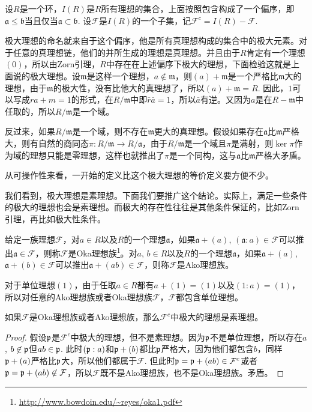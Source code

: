 \para 设$R$是一个环，$I(R)$是$R$所有理想的集合，上面按照包含构成了一个偏序，即$\mathfrak{a}\leq \mathfrak{b}$当且仅当$\mathfrak{a}\subset \mathfrak{b}$. 设$\mathcal{F}$是$I(R)$的一个子集，记$\mathcal{F}^c=I(R)-\mathcal{F}$.

极大理想的命名就来自于这个偏序，他是所有真理想构成的集合中的极大元素。对于任意的真理想链，他们的并所生成的理想是真理想。并且由于$R$肯定有一个理想$(0)$，所以由Zorn引理，$R$中存在在上述偏序下极大的理想，下面检验这就是上面说的极大理想。设$\mathfrak{m}$是这样一个理想，$a\notin \mathfrak{m}$，则$(a)+\mathfrak{m}$是一个严格比$\mathfrak{m}$大的理想，由于$\mathfrak{m}$的极大性，没有比他大的真理想了，所以$(a)+\mathfrak{m}=R$. 因此，$1$可以写成$ra+m=1$的形式，在$R/\mathfrak{m}$中即$\bar{r}\bar{a}=1$，所以$\bar{a}$有逆。又因为$a$是在$R-\mathfrak{m}$中任取的，所以$R/\mathfrak{m}$是一个域。

反过来，如果$R/\mathfrak{m}$是一个域，则不存在$\mathfrak{m}$更大的真理想。假设如果存在$\mathfrak{a}$比$\mathfrak{m}$严格大，则有自然的商同态$\pi:R/\mathfrak{m}\to R/\mathfrak{a}$，由于$R/\mathfrak{m}$是一个域且$\pi$是满射，则$\ker \pi$作为域的理想只能是零理想，这样也就推出了$\pi$是一个同构，这与$\mathfrak{a}$比$\mathfrak{m}$严格大矛盾。

从可操作性来看，一开始的定义比这个极大理想的等价定义要方便不少。

\para \label{oka}我们看到，极大理想是素理想。下面我们要推广这个结论。实际上，满足一些条件的极大的理想也会是素理想。而极大的存在性往往是其他条件保证的，比如Zorn引理，再比如极大性条件。

给定一族理想$\mathcal{F}$，对$a\in R$以及$R$的一个理想$\mathfrak{a}$，如果$\mathfrak{a}+(a)$, $(\mathfrak{a}:a)\in \mathcal{F}$可以推出$\mathfrak{a}\in \mathcal{F}$，则称$\mathcal{F}$是Oka理想族\footnote{\url{http://www.bowdoin.edu/~reyes/oka1.pdf}}。对$a$, $b\in R$以及$R$的一个理想$\mathfrak{a}$，如果$\mathfrak{a}+(a)$, $\mathfrak{a}+(b)\in \mathcal{F}$可以推出$\mathfrak{a}+(ab)\in \mathcal{F}$，则称$\mathcal{F}$是Ako理想族。

对于单位理想$(1)$，由于任取$a\in R$都有$a+(1)=(1)$以及$(1:a)=(1)$，所以对任意的Ako理想族或者Oka理想族$\mathcal{F}$，$\mathcal{F}$都包含单位理想。

\begin{pro} 如果$\mathcal{F}$是Oka理想族或者Ako理想族，那么$\mathcal{F}^c$中极大的理想是素理想。
\end{pro}

\begin{proof}
	假设$\mathfrak{p}$是$\mathcal{F}^c$中极大的理想，但不是素理想。因为$\mathfrak{p}$不是单位理想，所以存在$a$, $b\not\in \mathfrak{p}$但$ab\in\mathfrak{p}$. 此时$(\mathfrak{p}:a)$和$\mathfrak{p}+(b)$都比$\mathfrak{p}$严格大，因为他们都包含$b$，同样$\mathfrak{p}+(a)$严格比$\mathfrak{p}$大，所以他们都属于$\mathcal{F}$. 但此时$\mathfrak{p}=\mathfrak{p}+(ab)\in \mathcal{F}^c$或者$\mathfrak{p}=\mathfrak{p}+(ab)\not\in \mathcal{F}$，所以$\mathcal{F}$既不是Ako理想族，也不是Oka理想族。矛盾。
\end{proof}

